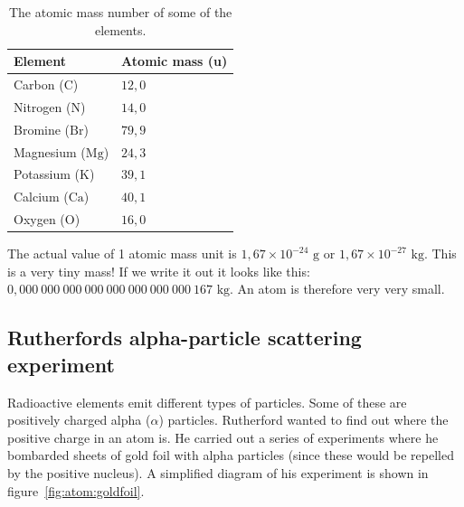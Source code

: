  
          \begin{table}[H]
        \begin{center}
      \label{m38756*uid8}
    \noindent
      \begin{tabular}{|l|l|}\hline
\textbf{Element} & \textbf{Atomic mass (u)} \\ \hline
Carbon ($\text{C}$) & $12,0$ \\ \hline
Nitrogen ($\text{N}$) & $14,0$ \\ \hline
Bromine ($\text{Br}$) & $79,9$ \\ \hline
Magnesium ($\text{Mg}$) & $24,3$ \\ \hline
Potassium ($\text{K}$) & $39,1$ \\ \hline
Calcium ($\text{Ca}$) & $40,1$ \\ \hline
Oxygen ($\text{O}$) & $16,0$ \\ \hline
    \end{tabular}
      \end{center}
    \caption{The atomic mass number of some of the elements.}
\label{tab:atomic mass}
\end{table}
        \label{m38756*id255096}The actual value of 1 atomic mass unit is $1,67 \times {10}^{-24} \text{ g}$ or $1,67 \times {10}^{-27} \text{ kg}$. This is a very tiny mass! If we write it out it looks like this: $0,000~000~000~000~000~000~000~000~167\text{ kg}$. An atom is therefore very very small. 
\label{m38756*eip-320}
            \subsection*{Rutherfords alpha-particle scattering experiment}
            \nopagebreak
            \label{m38756*id254668}Radioactive elements emit different types of particles. Some of these are positively charged alpha ($\alpha $) particles.
Rutherford wanted to find out where the positive charge in an atom is. He carried out a series of experiments where he bombarded sheets of gold foil with alpha particles (since these would be repelled by the positive nucleus). A simplified diagram of his experiment is shown in figure~\ref{fig:atom:goldfoil}.

